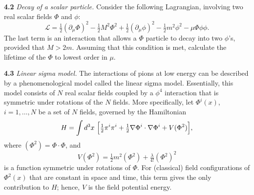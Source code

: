 \textbf{4.2} \emph{Decay of a scalar particle.}  Consider the following
Lagrangian, involving two real scalar fields $\Phi$ and $\phi$:
\begin{equation}
  \mathcal{L} = \tfrac{1}{2}(\partial_\mu\Phi)^2 - \tfrac{1}{2}M^2\Phi^2
    + \tfrac{1}{2}(\partial_\mu\phi)^2 - \tfrac{1}{2}m^2\phi^2
    - \mu\Phi\phi\phi .
\end{equation}
The last term is an interaction that allows a $\Phi$ particle to decay into
two $\phi$'s, provided that $M > 2m$.  Assuming that this condition is met,
calculate the lifetime of the $\Phi$ to lowest order in $\mu$.

\textbf{4.3} \emph{Linear sigma model.}  The interactions of pions at low
energy can be described by a phenomenological model called the linear sigma
model.  Essentially, this model consists of $N$ real scalar fields coupled by
a $\phi^4$ interaction that is symmetric under rotations of the $N$ fields.
More specifically, let $\Phi^i(x)$, $i = 1, \ldots, N$ be a set of $N$ fields,
governed by the Hamiltonian
\begin{equation}
  H = \int d^3x\ \Bigl[ \tfrac{1}{2}\pi^i\pi^i
    + \tfrac{1}{2}\nabla\Phi^i\cdot\nabla\Phi^i
    + V(\Phi^2) \Bigr],
\end{equation}
where $(\Phi^2) = \Phi\cdot\Phi$, and
\begin{equation}
  V(\Phi^2) = \tfrac{1}{2}m^2(\Phi^2) + \tfrac{\lambda}{4!}(\Phi^2)^2
\end{equation}
is a function symmetric under rotations of $\Phi$.  For (classical) field
configurations of $\Phi^2(x)$ that are constant in space and time, this term
gives the only contribution to $H$; hence, $V$ is the field potential energy.

